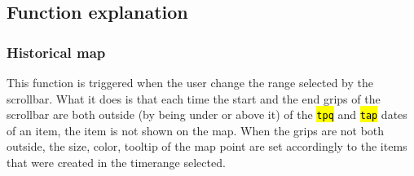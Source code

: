\documentclass[a4paper,12pt,twoside]{book}
\let\OldTexttt\texttt
\renewcommand{\texttt}[1]{\OldTexttt{\hl{#1}}}
\begin{document}
			\subsection{Function explanation}\label{function-explanation}

				\subsubsection{Historical map}\label{historical-map}

This function is triggered when the user change the range selected by the scrollbar. What it does is that each time the start and the end grips of the scrollbar are both outside (by being under or above it) of the \texttt{tpq} and \texttt{tap} dates of an item, the item is not shown on the map. When the grips are not both outside, the size, color, tooltip of the map point are set accordingly to the items that were created in the timerange selected.
\end{document}
